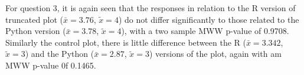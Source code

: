 \documentclass[
]{article}
\newenvironment{Shaded}{\begin{snugshade}}{\end{snugshade}}
\newcommand{\DecValTok}[1]{\textcolor[rgb]{0.00,0.00,0.81}{#1}}
\newcommand{\KeywordTok}[1]{\textcolor[rgb]{0.13,0.29,0.53}{\textbf{#1}}}
\newcommand{\NormalTok}[1]{#1}
\newcommand{\OperatorTok}[1]{\textcolor[rgb]{0.81,0.36,0.00}{\textbf{#1}}}
\newcommand{\StringTok}[1]{\textcolor[rgb]{0.31,0.60,0.02}{#1}}
\begin{document}
For question 3, it is again seen that the responses in relation to the R
version of truncated plot (\(\bar{x} = 3.76\), \(\tilde{x} = 4\)) do not
differ significantly to those related to the Python version
(\(\bar{x} = 3.78\), \(\tilde{x} = 4\)), with a two sample MWW p-value
of 0.9708. Similarly the control plot, there is little difference
between the R (\(\bar{x} = 3.342\), \(\tilde{x} = 3\)) and the Python
(\(\bar{x} = 2.87\), \(\tilde{x} = 3\)) versions of the plot, again with
am MWW p-value 0f 0.1465.

\begin{Shaded}
\end{Shaded}
\end{document}

